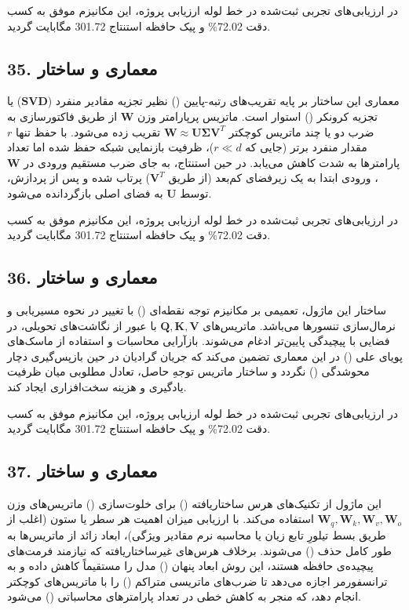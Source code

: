 \documentclass[12pt,a4paper]{report}
\theoremstyle{definition}
\begin{document}
در ارزیابی‌های تجربی ثبت‌شده در خط لوله ارزیابی پروژه، این مکانیزم موفق به کسب دقت 72.02\% و پیک حافظه استنتاج 301.72 مگابایت گردید.

\subsection*{35. معماری و ساختار }
معماری این ساختار بر پایه تقریب‌های رتبه-پایین () نظیر تجزیه مقادیر منفرد ($\mathbf{SVD}$) یا تجزیه کرونکر () استوار است. ماتریس پرپارامتر وزن $\mathbf{W}$ از طریق فاکتورسازی به ضرب دو یا چند ماتریس کوچکتر $\mathbf{W} \approx \mathbf{U} \mathbf{\Sigma} \mathbf{V}^T$ تقریب زده می‌شود. با حفظ تنها $r$ مقدار منفرد برتر (جایی که $r \ll d$)، ظرفیت بازنمایی شبکه حفظ شده اما تعداد پارامترها به شدت کاهش می‌یابد. در حین استنتاج، به جای ضرب مستقیم ورودی در $\mathbf{W}$، ورودی ابتدا به یک زیرفضای کم‌بعد (از طریق $\mathbf{V}^T$) پرتاب شده و پس از پردازش، توسط $\mathbf{U}$ به فضای اصلی بازگردانده می‌شود.

در ارزیابی‌های تجربی ثبت‌شده در خط لوله ارزیابی پروژه، این مکانیزم موفق به کسب دقت 72.02\% و پیک حافظه استنتاج 301.72 مگابایت گردید.

\subsection*{36. معماری و ساختار }
ساختار این ماژول، تعمیمی بر مکانیزم توجه نقطه‌ای () با تغییر در نحوه مسیریابی و نرمال‌سازی تنسورها می‌باشد. ماتریس‌های $\mathbf{Q, K, V}$ با عبور از نگاشت‌های تحویلی، در فضایی با پیچیدگی پایین‌تر ادغام می‌شوند. بازآرایی محاسبات و استفاده از ماسک‌های پویای علی () در این معماری تضمین می‌کند که جریان گرادیان در حین بازپس‌گیری دچار محوشدگی () نگردد و ساختار ماتریس توجهِ حاصل، تعادل مطلوبی میان ظرفیت یادگیری و هزینه سخت‌افزاری ایجاد کند.

در ارزیابی‌های تجربی ثبت‌شده در خط لوله ارزیابی پروژه، این مکانیزم موفق به کسب دقت 72.02\% و پیک حافظه استنتاج 301.72 مگابایت گردید.

\subsection*{37. معماری و ساختار }
این ماژول از تکنیک‌های هرس ساختاریافته () برای خلوت‌سازی () ماتریس‌های وزن $\mathbf{W}_q, \mathbf{W}_k, \mathbf{W}_v, \mathbf{W}_o$ استفاده می‌کند. با ارزیابی میزان اهمیت هر سطر یا ستون (اغلب از طریق بسط تیلورِ تابع زیان یا محاسبه نرم مقادیر ویژگی)، ابعاد زائد از ماتریس‌ها به طور کامل حذف () می‌شوند. برخلاف هرس‌های غیرساختاریافته که نیازمند فرمت‌های پیچیده‌ی حافظه هستند، این روش ابعاد پنهان () مدل را مستقیماً کاهش داده و به ترانسفورمر اجازه می‌دهد تا ضرب‌های ماتریسی متراکم () را با ماتریس‌های کوچکتر انجام دهد، که منجر به کاهش خطی در تعداد پارامترهای محاسباتی () می‌شود.
\end{document}

